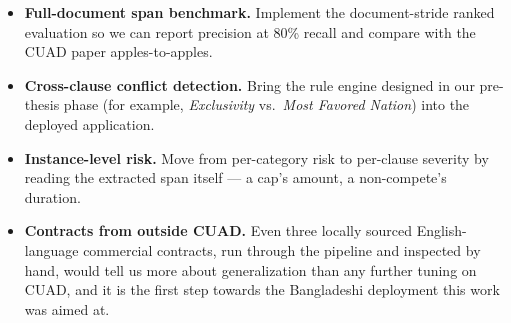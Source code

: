\begin{itemize}[itemsep=2pt]
  \item \textbf{Full-document span benchmark.} Implement the document-stride ranked evaluation so we can report precision at 80\% recall and compare with the CUAD paper apples-to-apples.
  \item \textbf{Cross-clause conflict detection.} Bring the rule engine designed in our pre-thesis phase (for example, \emph{Exclusivity} vs.\ \emph{Most Favored Nation}) into the deployed application.
  \item \textbf{Instance-level risk.} Move from per-category risk to per-clause severity by reading the extracted span itself --- a cap's amount, a non-compete's duration.
  \item \textbf{Contracts from outside CUAD.} Even three locally sourced English-language commercial contracts, run through the pipeline and inspected by hand, would tell us more about generalization than any further tuning on CUAD, and it is the first step towards the Bangladeshi deployment this work was aimed at.
\end{itemize}
